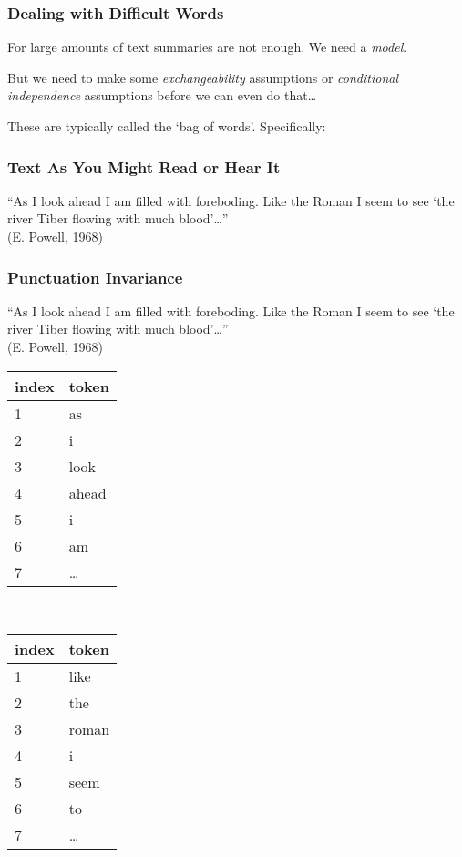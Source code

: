 \documentclass[11pt,compress,professionalfonts]{beamer}
\begin{document}
\begin{frame}[t,fragile]\frametitle{Dealing with Difficult Words}

For large amounts of text summaries are not enough. We need a \textit{model}.

But we need to make some \textsl{exchangeability} assumptions or
\textit{conditional independence} assumptions before we can even do that\ldots


These are typically called the `bag of words'.  Specifically:

\end{frame}
\begin{frame}[t,fragile]\frametitle{Text As You Might Read or Hear It}

``As I look ahead I am filled with foreboding.  Like the Roman I seem to see `the river Tiber flowing with much blood'\ldots ''\\
(E. Powell, 1968)


\end{frame}
\begin{frame}[t,fragile]\frametitle{Punctuation Invariance}

``As I look ahead I am filled with foreboding.  Like the Roman I seem to see `the river Tiber flowing with much blood'\ldots ''\\
(E. Powell, 1968)
\begin{center}
\small
\begin{tabular}{ll}\toprule
index & token\\ \midrule
1 & as\\
2 & i\\
3 & look\\
4 & ahead\\
5 & i\\
6 & am\\
7 & \ldots\\ \bottomrule
\end{tabular}
~~~~~~~~~~
\begin{tabular}{ll}\toprule
index & token\\ \midrule
1 & like\\
2 & the\\
3 & roman\\
4 & i\\
5 & seem\\
6 & to\\
7 & \ldots\\ \bottomrule
\end{tabular}
\normalsize
\end{center}


\end{frame}
\end{document}
